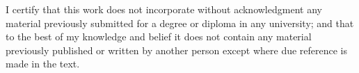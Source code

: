 \documentclass[a4paper,12pt]{report}
\begin{document}
\pagestyle{empty} %






I certify that this work does not incorporate without acknowledgment any material previously 
submitted for a degree or diploma in any university; and that to the best of my
 knowledge 
and belief it does not contain any material previously published or written by another person 
except where due reference is made in the text.

\newpage





\tableofcontents %
\cleardoublepage %


\pagestyle{plain} %

\clearpage
{}
\listoffigures

















\end{document}

